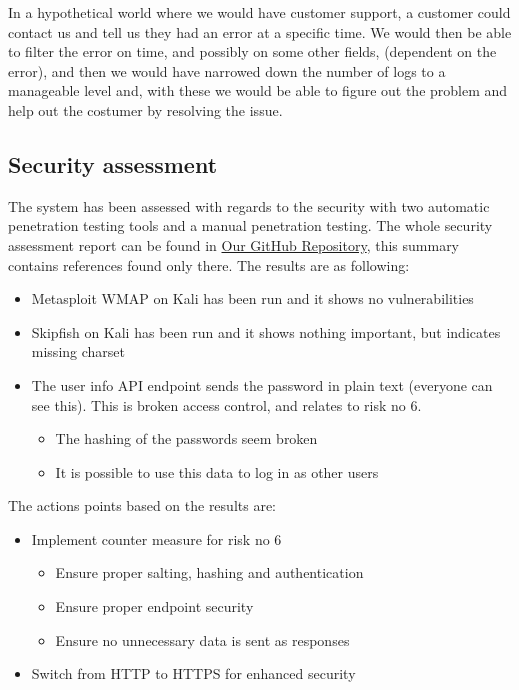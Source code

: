 \documentclass[10pt]{article}
\begin{document}
In a hypothetical world where we would have customer support, a customer could contact us and tell us they had an error at a specific time. We would then be able to filter the error on time, and possibly on some other fields, (dependent on the error), and then we would have narrowed down the number of logs to a manageable level and, with these we would be able to figure out the problem and help out the costumer by resolving the issue. 
\subsection{Security assessment}
The system has been assessed with regards to the security with two automatic penetration testing tools and a manual penetration testing. The whole security assessment report can be found in \href{https://github.com/Arklaide/devopsITUproject/blob/main/report/sub-reports/SecurityAssessment.md}{Our GitHub Repository}, this summary contains references found only there. The results are as following:

\begin{itemize}
    \item Metasploit WMAP on Kali has been run and it shows no vulnerabilities
    \item Skipfish on Kali has been run and it shows nothing important, but indicates missing charset
    \item The user info API endpoint sends the password in plain text (everyone can see this). This is broken access control, and relates to risk no 6.
    \begin{itemize}
        \item The hashing of the passwords seem broken
        \item It is possible to use this data to log in as other users
    \end{itemize}
\end{itemize}

The actions points based on the results are:
\begin{itemize}
    \item Implement counter measure for risk no 6
    \begin{itemize}
    \item Ensure proper salting, hashing and authentication 
    \item Ensure proper endpoint security
    \item Ensure no unnecessary data is sent as responses
    \end{itemize}
    \item Switch from HTTP to HTTPS for enhanced security
\end{itemize}
\end{document}
